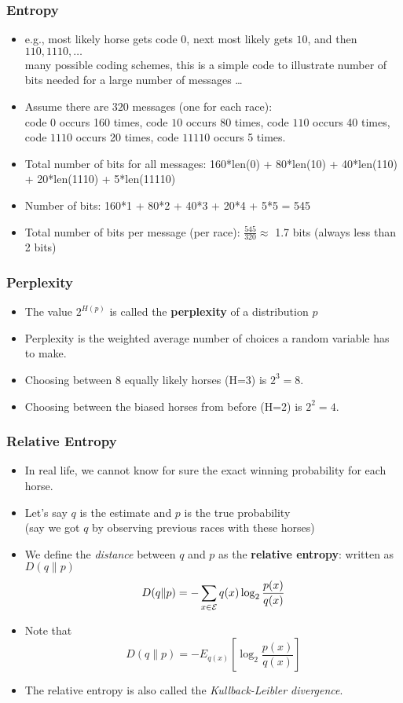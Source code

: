 \documentclass[handout]{beamer}
\begin{document}
\begin{frame}
\frametitle{Entropy}
\begin{itemize}[<+->]
\item e.g., most likely horse gets code $0$, next most likely gets $10$, and then $110, 1110, \ldots$ \\ {\small many possible coding schemes, this is a simple code to illustrate number of bits needed for a large number of messages \ldots}
\item Assume there are $320$ messages (one for each race): \\
code $0$ occurs 160 times, code $10$ occurs 80 times, code $110$ occurs 40 times, code $1110$ occurs 20 times, code $11110$ occurs 5 times.
\item Total number of bits for all messages: 160*len(0) + 80*len(10) + 40*len(110) + 20*len(1110) + 5*len(11110) 
\item Number of bits: 160*1 + 80*2 + 40*3 + 20*4 + 5*5 = 545
\item Total number of bits per message (per race): $\frac{545}{320} \approx$ 1.7 bits (always less than 2 bits)
\end{itemize}

\end{frame}

\begin{frame}
\frametitle{Perplexity}
\begin{itemize}[<+->]
\item The value $2^{H(p)}$ is called the {\bf perplexity} of a distribution $p$
\item Perplexity is the weighted average number of choices a random
  variable has to make.
\item Choosing between 8 equally likely horses (H=3) is $2^3 = 8$.
\item Choosing between the biased horses from before (H=2) is $2^2 =
  4$. 
\end{itemize}

\end{frame}

\begin{frame}
\frametitle{Relative Entropy}
\begin{itemize}[<+->]
\item In real life, we cannot know for sure the exact winning
  probability for each horse. 
\item Let's say $q$ is the estimate
  and $p$ is the true probability \\
  {\small (say we got $q$ by observing previous races with these horses)}
\item We define the {\em distance} between $q$ and $p$ as the {\bf relative entropy}: written as $D(q \| p)$
\[ D(q \| p) = - \sum_{x \in {\cal E}} q(x) \log_2 \frac{p(x)}{q(x)} \]
\item Note that
\[ D(q \| p) = - E_{ q(x) } \left[ \log_2 \frac{p(x)}{q(x)} \right] \]
\item The relative entropy is also called the {\em Kullback-Leibler divergence}.
\end{itemize}

\end{frame}
\end{document}
